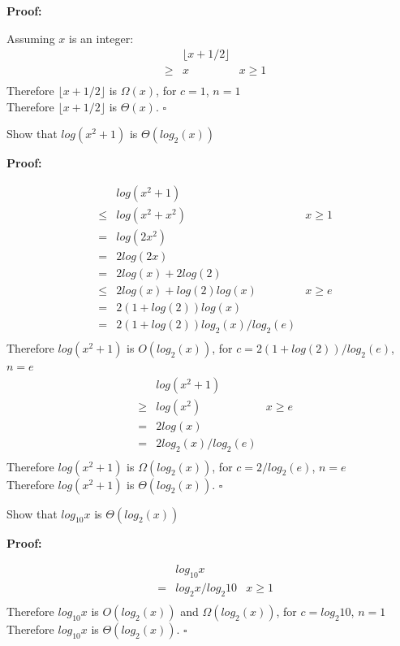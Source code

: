 \documentclass{article}
\newenvironment{proof}
{\color{PineGreen}\begin{list}{}%
         {\setlength{\leftmargin}{1cm}}%
         \item[]%
        \textbf{Proof:}
        
        }
{ $\square$\end{list}}
\begin{document}
\begin{enumerate}[label=\alph{enumi})]
\begin{proof}
Assuming $x$ is an integer:
\[\begin{array}{rclr}
&&\lfloor x + 1/2 \rfloor&\\
&\geq& x	&	x\geq 1\\
\end{array}\]
Therefore $\lfloor x + 1/2 \rfloor$ is $\Omega(x)$, for $c=1$, $n=1$\\
Therefore $\lfloor x + 1/2 \rfloor$ is $\Theta (x)$.
\end{proof}
\item Show that $log(x^2+1)$ is $\Theta (log_2(x))$
\begin{proof}
\[\begin{array}{rclr}
&&log(x^2+1)&\\
&\leq&log(x^2 + x^2) & x \geq 1 \\
&=&log(2x^2)&\\
&=&2log(2x)&\\
&=&2log(x) + 2log(2)&		\\
&\leq&2log(x) + log(2)log(x)&	x \geq e \\
&=&2(1 + log(2))log(x)&		\\
&=&2(1 + log(2))log_2(x)/log_2(e)&		\\
\end{array}\]
Therefore $log(x^2+1)$ is $O(log_2(x))$, for $c=2(1+ log(2))/log_2(e)$, $n=e$
\[\begin{array}{rclr}
&&log(x^2+1)&\\
&\geq& log(x^2)	&	x\geq e\\
&=& 2log(x)	&	\\
&=& 2log_2(x)/log_2(e)	&	\\
\end{array}\]
Therefore $log(x^2+1)$ is $\Omega(log_2(x))$, for $c=2/log_2(e)$, $n=e$\\
Therefore $log(x^2+1)$ is $\Theta (log_2(x))$.
\end{proof}
\item Show that $log_{10}x$ is $\Theta (log_2(x))$
\begin{proof}
\[\begin{array}{rclr}
&&log_{10}x&\\
&=&log_{2}x/log_{2}10	&	x \geq 1	\\
\end{array}\]
Therefore $log_{10}x$ is $O(log_2(x))$ and $\Omega(log_2(x))$, for $c=log_{2}10$, $n=1$
Therefore $log_{10}x$ is $\Theta (log_2(x))$.
\end{proof}
\end{enumerate}
\end{document}
